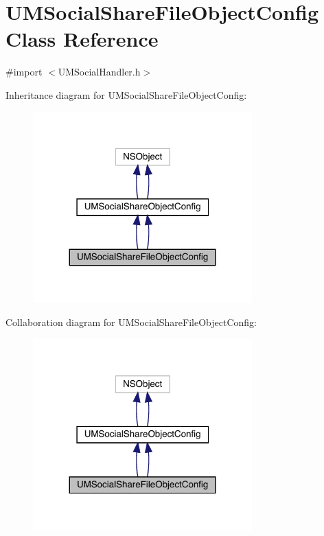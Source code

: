 \hypertarget{interface_u_m_social_share_file_object_config}{}\section{U\+M\+Social\+Share\+File\+Object\+Config Class Reference}
\label{interface_u_m_social_share_file_object_config}


{\ttfamily \#import $<$U\+M\+Social\+Handler.\+h$>$}



Inheritance diagram for U\+M\+Social\+Share\+File\+Object\+Config\+:\nopagebreak
\begin{figure}[H]
\begin{center}
\leavevmode
\includegraphics[width=239pt]{interface_u_m_social_share_file_object_config__inherit__graph}
\end{center}
\end{figure}


Collaboration diagram for U\+M\+Social\+Share\+File\+Object\+Config\+:\nopagebreak
\begin{figure}[H]
\begin{center}
\leavevmode
\includegraphics[width=239pt]{interface_u_m_social_share_file_object_config__coll__graph}
\end{center}
\end{figure}
